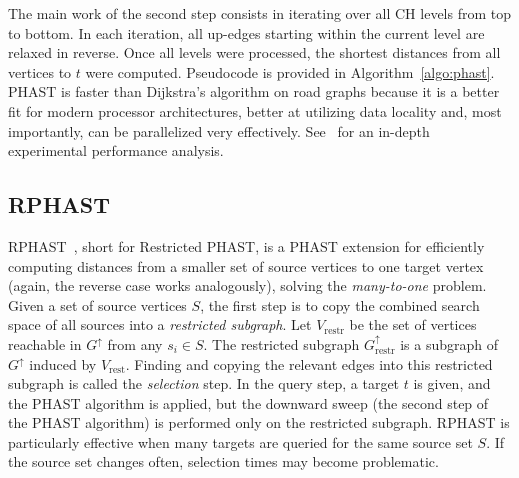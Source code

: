 \documentclass[manuscript,review]{acmart}
\newcommand*{\gchu}{G^{\uparrow}}
\begin{document}
The main work of the second step consists in iterating over all CH levels from top to bottom.
In each iteration, all up-edges starting within the current level are relaxed in reverse.
Once all levels were processed, the shortest distances from all vertices to $t$ were computed.
Pseudocode is provided in Algorithm~\ref{algo:phast}.
PHAST is faster than Dijkstra's algorithm on road graphs because it is a better fit for modern processor architectures, better at utilizing data locality and, most importantly, can be parallelized very effectively.
See~\cite{dgnw-phast-13} for an in-depth experimental performance analysis.


\subsection{RPHAST}

RPHAST~\cite{delling_et_al:OASIcs:2011:3266}, short for Restricted PHAST, is a PHAST extension for efficiently computing distances from a smaller set of source vertices to one target vertex (again, the reverse case works analogously), solving the \emph{many-to-one} problem.
Given a set of source vertices $S$, the first step is to copy the combined search space of all sources into a \emph{restricted subgraph}.
Let $V_{\operatorname{restr}}$ be the set of vertices reachable in $\gchu$ from any $s_i \in S$.
The restricted subgraph $\gchu_{\operatorname{restr}}$ is a subgraph of $\gchu$ induced by $V_{\operatorname{rest}}$.
Finding and copying the relevant edges into this restricted subgraph is called the \emph{selection} step.
In the query step, a target $t$ is given, and the PHAST algorithm is applied, but the downward sweep (the second step of the PHAST algorithm) is performed only on the restricted subgraph.
RPHAST is particularly effective when many targets are queried for the same source set $S$.
If the source set changes often, selection times may become problematic.
\end{document}
